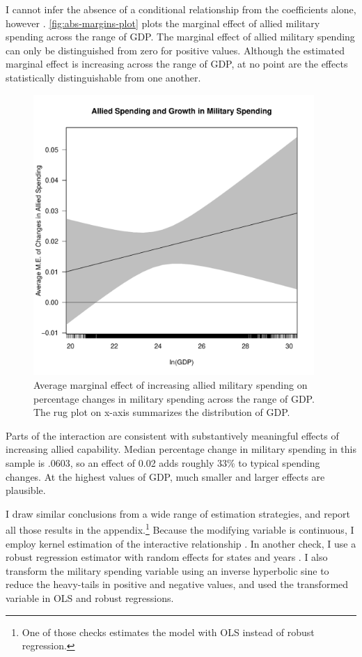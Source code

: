 \documentclass[12pt]{article}
\begin{document}
I cannot infer the absence of a conditional relationship from the coefficients alone, however \citep{BramborClarkGolder2006}. 
\autoref{fig:abs-margins-plot} plots the marginal effect of allied military spending across the range of GDP. 
The marginal effect of allied military spending can only be distinguished from zero for positive values. 
Although the estimated marginal effect is increasing across the range of GDP, at no point are the effects statistically distinguishable from one another. 


\begin{figure}
	\centering
		\includegraphics[width=0.95\textwidth]{abs-margins-plot.pdf}
	\caption{Average marginal effect of increasing allied military spending on percentage changes in military spending across the range of GDP. The rug plot on x-axis summarizes the distribution of GDP.}
		\label{fig:abs-margins-plot}
\end{figure}


Parts of the interaction are consistent with substantively meaningful effects of increasing allied capability. 
Median percentage change in military spending in this sample is .0603, so an effect of 0.02 adds roughly 33\% to typical spending changes. 
At the highest values of GDP, much smaller and larger effects are plausible. 


I draw similar conclusions from a wide range of estimation strategies, and report all those results in the appendix.\footnote{One of those checks estimates the model with OLS instead of robust regression.}
Because the modifying variable is continuous, I employ kernel estimation of the interactive relationship \citep{Hainmuelleretal2019}.
In another check, I use a robust regression estimator with random effects for states and years \citep{Koller2016}. 
I also transform the military spending variable using an inverse hyperbolic sine to reduce the heavy-tails in positive and negative values, and used the transformed variable in OLS and robust regressions. 
\end{document}

